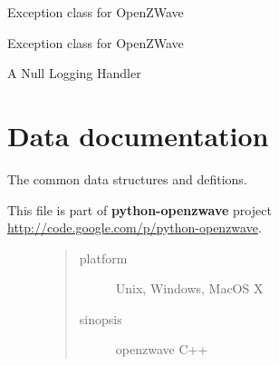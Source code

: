 \documentclass[letterpaper,10pt,english]{sphinxmanual}
\begin{document}

\begin{fulllineitems}
\label{object:openzwave.object.ZWaveCacheException}
Exception class for OpenZWave

\end{fulllineitems}


\begin{fulllineitems}
\label{object:openzwave.object.ZWaveCommandClassException}
Exception class for OpenZWave

\end{fulllineitems}


\begin{fulllineitems}
\label{object:openzwave.object.NullLoggingHandler}
A Null Logging Handler

\end{fulllineitems}



\section{Data documentation}
\label{data:data-documentation}\label{data::doc}
The common data structures and defitions.
\label{data:module-libopenzwave}\label{data:module-libopenzwave}\begin{description}
\item[{This file is part of \textbf{python-openzwave} project \href{http://code.google.com/p/python-openzwave}{http://code.google.com/p/python-openzwave}.}] \leavevmode\begin{quote}\begin{description}
\item[{platform}] \leavevmode
Unix, Windows, MacOS X

\item[{sinopsis}] \leavevmode
openzwave C++

\end{description}\end{quote}

\end{description}
\end{document}
